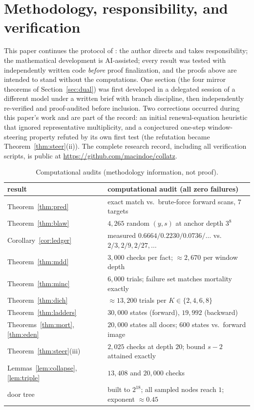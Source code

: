 \documentclass[11pt]{article}
\theoremstyle{remark}
\begin{document}
\appendix
\section{Methodology, responsibility, and verification}\label{app:method}
This paper continues the protocol of \cite[App.~A]{paper1}: the author directs and takes responsibility; the mathematical development is AI-assisted; every result was tested with independently written code \emph{before} proof finalization, and the proofs above are intended to stand without the computations. One section (the four mirror theorems of Section~\ref{sec:dual}) was first developed in a delegated session of a different model under a written brief with branch discipline, then independently re-verified and proof-audited before inclusion. Two corrections occurred during this paper's work and are part of the record: an initial renewal-equation heuristic that ignored representative multiplicity, and a conjectured one-step window-steering property refuted by its own first test (the refutation became Theorem~\ref{thm:steer}(ii)). The complete research record, including all verification scripts, is public at \url{https://github.com/macindoe/collatz}.

\begin{table}[h]\centering\small
\begin{tabular}{l|l}
result & computational audit (all zero failures) \\\hline
Theorem~\ref{thm:pred} & exact match vs.\ brute-force forward scans, $7$ targets \\
Theorem~\ref{thm:blaw} & $4{,}265$ random $(y,s)$ at anchor depth $3^8$ \\
Corollary~\ref{cor:ledger} & measured $0.6664/0.2230/0.0736/\ldots$ vs.\ $2/3, 2/9, 2/27,\ldots$ \\
Theorem~\ref{thm:mdd} & $3{,}000$ checks per fact; $\approx2{,}670$ per window depth \\
Theorem~\ref{thm:minc} & $6{,}000$ trials; failure set matches mortality exactly \\
Theorem~\ref{thm:dich} & $\approx13{,}200$ trials per $K \in \{2,4,6,8\}$ \\
Theorem~\ref{thm:ladders} & $30{,}000$ states (forward), $19{,}992$ (backward) \\
Theorems~\ref{thm:mort}, \ref{thm:eden} & $20{,}000$ states all doors; $600$ states vs.\ forward image \\
Theorem~\ref{thm:steer}(iii) & $2{,}025$ checks at depth $20$; bound $s-2$ attained exactly \\
Lemmas~\ref{lem:collapse}, \ref{lem:triple} & $13{,}408$ and $20{,}000$ checks \\
door tree & built to $2^{18}$; all sampled nodes reach $1$; exponent $\approx0.45$ \\
\end{tabular}
\caption{Computational audits (methodology information, not proof).}\label{tab:verify}
\end{table}
\end{document}
